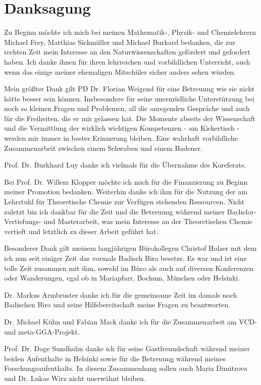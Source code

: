 \chapter*{Danksagung}
\thispagestyle{empty}
Zu Beginn möchte ich mich bei meinen Mathematik-, Physik- und Chemielehrern Michael Frey, Matthias Sickmüller und Michael Burkard bedanken, die zur rechten Zeit mein Interesse an den Naturwissenschaften gefördert und gefordert haben. Ich danke ihnen für ihren lehrreichen und vorbildlichen Unterricht, auch wenn das einige meiner ehemaligen Mitschüler sicher anders sehen würden.

\bigskip
Mein größter Dank gilt PD Dr. Florian Weigend für eine Betreuung wie sie nicht hätte besser sein können. Insbesondere für seine unermüdliche Unterstützung bei noch so kleinen Fragen und Problemen, all die anregenden Gespräche und auch für die Freiheiten, die er mir gelassen hat. Die Momente abseits der Wissenschaft und die Vermittlung der wirklich wichtigen Kompetenzen - am Kickertisch - werden mir immer in bester Erinnerung bleiben. Eine wahrhaft vorbildliche Zusammenarbeit zwischen einem Schwaben und einem Badener.

\bigskip
Prof. Dr. Burkhard Luy danke ich vielmals für die Übernahme des Koreferats.

\bigskip
Bei Prof. Dr. Willem Klopper möchte ich mich für die Finanzierung zu Beginn meiner Promotion bedanken. Weiterhin danke ich ihm für die Nutzung der am Lehrstuhl für Theoretische Chemie zur Verfügen stehenden Ressourcen. Nicht zuletzt bin ich dankbar für die Zeit und die Betreuung während meiner Bachelor- Vertiefungs- und Masterarbeit, was mein Interesse an der Theoretischen Chemie vertieft und letztlich zu dieser Arbeit geführt hat.

\bigskip
Besonderer Dank gilt meinem langjährigen Bürokollegen Christof Holzer mit dem ich nun seit einiger Zeit das \glqq vormals Badisch Biro\grqq{} besetze. Es war und ist eine tolle Zeit zusammen mit ihm, sowohl im Büro als auch auf diversen Konferenzen oder Wanderungen, egal ob in Mariapfarr, Bochum, München oder Helsinki.

\bigskip
Dr. Markus Armbruster danke ich für die gemeinsame Zeit im damals noch \glqq Badischen Biro\grqq{} und seine Hilfsbereitschaft meine Fragen zu beantworten. 

Dr. Michael Kühn und Fabian Mack danke ich für die Zusammenarbeit am VCD- und meta-GGA-Projekt.  

\bigskip
Prof. Dr. Dage Sundholm danke ich für seine Gastfreundschaft während meiner beiden Aufenthalte in Helsinki sowie für die Betreuung während meines Forschungsaufenthalts. In diesem Zusammenhang sollen auch Maria Dimitrova und Dr. Lukas Wirz nicht unerwähnt bleiben.

